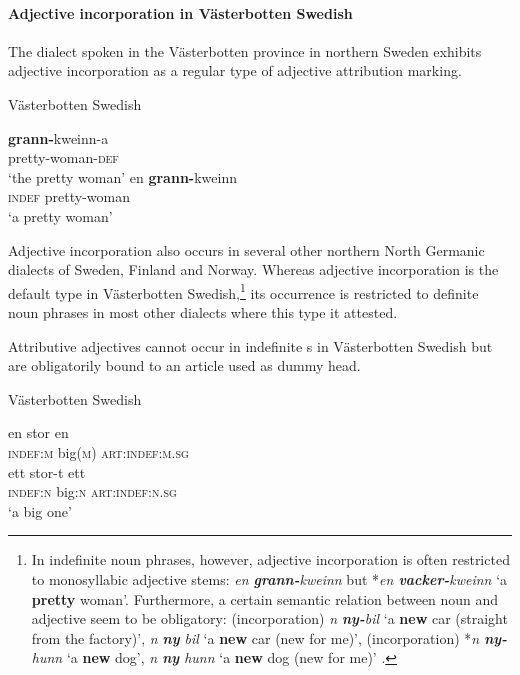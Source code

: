 \paragraph*{Adjective incorporation in Västerbotten Swedish}
\label{bondska synchr}
The dialect spoken in the Västerbotten province in northern Sweden exhibits adjective incorporation as a regular type of adjective attribution marking.
\begin{exe}
\ex \rm{Västerbotten Swedish \citep[91–92]{holmberg-etal2003}}
\begin{xlist}
\ex
\gll 	\textbf{grann-}kweinn-a\\	
	pretty-woman-\textsc{def}\\
\glt	‘the pretty woman’
\ex
\gll	en \textbf{grann-}kweinn\\
	\textsc{indef} pretty-woman\\
\glt	‘a pretty woman’
\end{xlist}
\end{exe}
Adjective incorporation also occurs in several other northern North Germanic dialects of Sweden, Finland and Norway. Whereas adjective incorporation is the default type in Västerbotten Swedish,\footnote{In indefinite noun phrases, however, adjective incorporation is often restricted to monosyllabic adjective stems: \textit{en \textbf{grann-}kweinn} but *\textit{en \textbf{vacker-}kweinn} ‘a \textbf{pretty} woman’. Furthermore, a certain semantic relation between noun and adjective seem to be obligatory: (incorporation) \textit{n \textbf{ny-}bil} ‘a \textbf{new} car (straight from the factory)’, \textit{n \textbf{ny} bil} ‘a \textbf{new} car (new for me)’, (incorporation) *\textit{n \textbf{ny-}hunn} ‘a \textbf{new} dog’, \textit{n \textbf{ny} hunn} ‘a \textbf{new} dog (new for me)’ \citep[91–92]{holmberg-etal2003}.} its occurrence is restricted to definite noun phrases in most other dialects where this type it attested.

Attributive adjectives cannot occur in indefinite s in Västerbotten Swedish but are obligatorily bound to an article used as dummy head.
\begin{exe}
\ex \rm{Västerbotten Swedish \citep{holmberg-etal2003,delsing1996b}}
\begin{xlist}
\ex
\gll 	en stor en\\	
	\textsc{indef:m} big(\textsc{m}) \textsc{art:indef:m.sg}\\
\ex
\gll 	ett stor-t ett\\	
	\textsc{indef:n} big:\textsc{n} \textsc{art:indef:n.sg}\\
\glt	‘a big one’
\end{xlist}
\end{exe}

